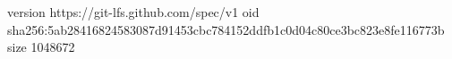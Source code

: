 version https://git-lfs.github.com/spec/v1
oid sha256:5ab28416824583087d91453cbc784152ddfb1c0d04c80ce3bc823e8fe116773b
size 1048672
